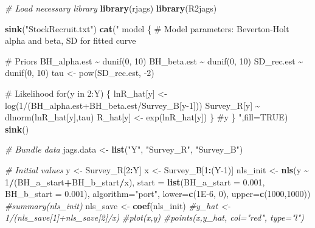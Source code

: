 \documentclass[
]{krantz}
\makeatletter
\newenvironment{Shaded}{\begin{snugshade}}{\end{snugshade}}
\newcommand{\AttributeTok}[1]{\textcolor[rgb]{0.27,0.27,0.27}{#1}}
\newcommand{\CommentTok}[1]{\textcolor[rgb]{0.37,0.37,0.37}{\textit{#1}}}
\newcommand{\ConstantTok}[1]{\textcolor[rgb]{0.37,0.37,0.37}{#1}}
\newcommand{\DecValTok}[1]{\textcolor[rgb]{0.06,0.06,0.06}{#1}}
\newcommand{\FloatTok}[1]{\textcolor[rgb]{0.06,0.06,0.06}{#1}}
\newcommand{\FunctionTok}[1]{\textcolor[rgb]{0.27,0.27,0.27}{\textbf{#1}}}
\newcommand{\NormalTok}[1]{#1}
\newcommand{\OtherTok}[1]{\textcolor[rgb]{0.37,0.37,0.37}{#1}}
\newcommand{\SpecialCharTok}[1]{\textcolor[rgb]{0.43,0.43,0.43}{\textbf{#1}}}
\newcommand{\StringTok}[1]{\textcolor[rgb]{0.5,0.5,0.5}{#1}}
\newenvironment{kframe}{%
\medskip{}
\setlength{\fboxsep}{.8em}
 \def\at@end@of@kframe{}%
 \ifinner\ifhmode%
  \def\at@end@of@kframe{\end{minipage}}%
  \begin{minipage}{\columnwidth}%
 \fi\fi%
 \def\FrameCommand##1{\hskip\@totalleftmargin \hskip-\fboxsep
 \colorbox{shadecolor}{##1}\hskip-\fboxsep
     \hskip-\linewidth \hskip-\@totalleftmargin \hskip\columnwidth}%
 \MakeFramed {\advance\hsize-\width
   \@totalleftmargin\z@ \linewidth\hsize
   \@setminipage}}%
 {\par\unskip\endMakeFramed%
 \at@end@of@kframe}
\renewenvironment{Shaded}{\begin{kframe}}{\end{kframe}}
\makeatother
\begin{document}
\begin{Shaded}
\begin{Highlighting}[]
\CommentTok{\# Load necessary library}
\FunctionTok{library}\NormalTok{(rjags)}
\FunctionTok{library}\NormalTok{(R2jags)}

\FunctionTok{sink}\NormalTok{(}\StringTok{"StockRecruit.txt"}\NormalTok{)}
\FunctionTok{cat}\NormalTok{(}\StringTok{"}
\StringTok{model \{}
\StringTok{\# Model parameters: Beverton{-}Holt alpha and beta, SD for fitted curve}

\StringTok{\# Priors}
\StringTok{ BH\_alpha.est \textasciitilde{} dunif(0, 10)}
\StringTok{ BH\_beta.est \textasciitilde{} dunif(0, 10)}
\StringTok{ SD\_rec.est \textasciitilde{} dunif(0, 10)}
\StringTok{ tau \textless{}{-} pow(SD\_rec.est, {-}2)}

\StringTok{\# Likelihood}
\StringTok{    for(y in 2:Y) \{}
\StringTok{      lnR\_hat[y] \textless{}{-} log(1/(BH\_alpha.est+BH\_beta.est/Survey\_B[y{-}1]))}
\StringTok{      Survey\_R[y] \textasciitilde{} dlnorm(lnR\_hat[y],tau)}
\StringTok{      R\_hat[y] \textless{}{-} exp(lnR\_hat[y])}
\StringTok{      \} \#y}
\StringTok{\}}
\StringTok{    "}\NormalTok{,}\AttributeTok{fill=}\ConstantTok{TRUE}\NormalTok{)}
\FunctionTok{sink}\NormalTok{()}

\CommentTok{\# Bundle data}
\NormalTok{jags.data }\OtherTok{\textless{}{-}} \FunctionTok{list}\NormalTok{(}\StringTok{"Y"}\NormalTok{, }\StringTok{"Survey\_R"}\NormalTok{, }\StringTok{"Survey\_B"}\NormalTok{)}

\CommentTok{\# Initial values}
\NormalTok{y }\OtherTok{\textless{}{-}}\NormalTok{ Survey\_R[}\DecValTok{2}\SpecialCharTok{:}\NormalTok{Y]}
\NormalTok{x }\OtherTok{\textless{}{-}}\NormalTok{ Survey\_B[}\DecValTok{1}\SpecialCharTok{:}\NormalTok{(Y}\DecValTok{{-}1}\NormalTok{)]}
\NormalTok{nls\_init }\OtherTok{\textless{}{-}} \FunctionTok{nls}\NormalTok{(y }\SpecialCharTok{\textasciitilde{}} \DecValTok{1}\SpecialCharTok{/}\NormalTok{(BH\_a\_start}\SpecialCharTok{+}\NormalTok{BH\_b\_start}\SpecialCharTok{/}\NormalTok{x),}
                \AttributeTok{start =} \FunctionTok{list}\NormalTok{(}\AttributeTok{BH\_a\_start =} \FloatTok{0.001}\NormalTok{, }\AttributeTok{BH\_b\_start =} \FloatTok{0.001}\NormalTok{),}
                \AttributeTok{algorithm=}\StringTok{"port"}\NormalTok{, }
                \AttributeTok{lower=}\FunctionTok{c}\NormalTok{(}\FloatTok{1E{-}6}\NormalTok{, }\DecValTok{0}\NormalTok{), }\AttributeTok{upper=}\FunctionTok{c}\NormalTok{(}\DecValTok{1000}\NormalTok{,}\DecValTok{1000}\NormalTok{))}
\CommentTok{\#summary(nls\_init)}
\NormalTok{nls\_save }\OtherTok{\textless{}{-}} \FunctionTok{coef}\NormalTok{(nls\_init)}
\CommentTok{\#y\_hat \textless{}{-} 1/(nls\_save[1]+nls\_save[2]/x)}
\CommentTok{\#plot(x,y)}
\CommentTok{\#points(x,y\_hat, col="red", type="l")}


\end{Highlighting}
\end{Shaded}
\end{document}
